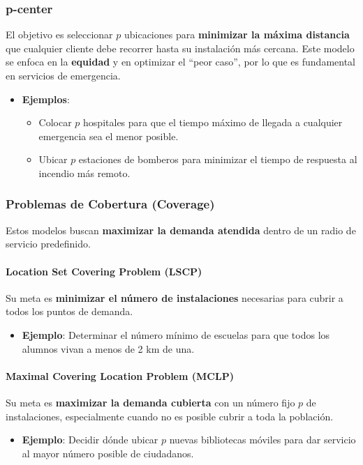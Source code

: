 \documentclass[12pt,a4paper]{book}
\begin{document}
\subsubsection{p-center}
El objetivo es seleccionar $p$ ubicaciones para \textbf{minimizar la máxima distancia} que cualquier cliente debe recorrer hasta su instalación más cercana. Este modelo se enfoca en la \textbf{equidad} y en optimizar el ``peor caso'', por lo que es fundamental en servicios de emergencia.
\begin{itemize}
    \item \textbf{Ejemplos}:
    \begin{itemize}
        \item Colocar $p$ hospitales para que el tiempo máximo de llegada a cualquier emergencia sea el menor posible.
        \item Ubicar $p$ estaciones de bomberos para minimizar el tiempo de respuesta al incendio más remoto.
    \end{itemize}
\end{itemize}

\subsubsection{Problemas de Cobertura (Coverage)}
Estos modelos buscan \textbf{maximizar la demanda atendida} dentro de un radio de servicio predefinido.

\paragraph{Location Set Covering Problem (LSCP)} Su meta es \textbf{minimizar el número de instalaciones} necesarias para cubrir a todos los puntos de demanda.
\begin{itemize}
    \item \textbf{Ejemplo}: Determinar el número mínimo de escuelas para que todos los alumnos vivan a menos de 2 km de una.
\end{itemize}

\paragraph{Maximal Covering Location Problem (MCLP)} Su meta es \textbf{maximizar la demanda cubierta} con un número fijo $p$ de instalaciones, especialmente cuando no es posible cubrir a toda la población.
\begin{itemize}
    \item \textbf{Ejemplo}: Decidir dónde ubicar $p$ nuevas bibliotecas móviles para dar servicio al mayor número posible de ciudadanos.
\end{itemize}
\end{document}

